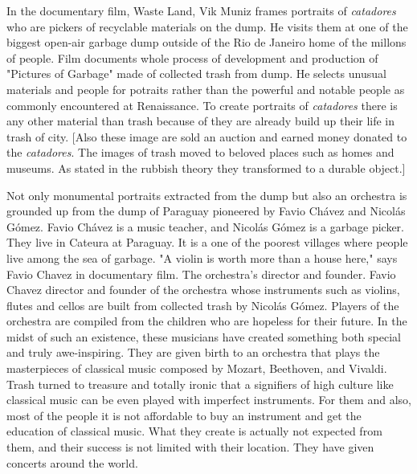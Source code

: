 In the documentary film, Waste Land, Vik Muniz frames portraits of \textit{catadores} who are pickers of recyclable materials on the dump. He visits them at one of the biggest open-air garbage dump outside of the Rio de Janeiro home of the millons of people. Film documents whole process of development and production of "Pictures of Garbage" made of collected trash from dump. He selects unusual materials and people for potraits rather than the powerful and notable people as commonly encountered at Renaissance. To create portraits of \textit{catadores} there is any other material than trash because of they are already build up their life in trash of city. [Also these image are sold an auction and earned money donated to the \textit{catadores}. The images of trash moved to beloved places such as homes and museums. As stated in the rubbish theory they transformed to a durable object.]


Not only monumental portraits extracted from the dump but also an orchestra is grounded up from the dump of Paraguay pioneered by Favio Chávez and Nicolás Gómez. Favio Chávez is a music teacher, and Nicolás Gómez is a garbage picker. They live in Cateura at Paraguay. It is a one of the poorest villages where people live among the sea of garbage. "A violin is worth more than a house here," says Favio Chavez in documentary film. The orchestra's director and founder. Favio Chavez director and founder of the orchestra whose instruments such as violins, flutes and cellos are built from collected trash by Nicolás Gómez. Players of the orchestra are compiled from the children who are hopeless for their future. In the midst of such an existence, these musicians have created something both special and truly awe-inspiring. They are given birth to an orchestra that plays the masterpieces of classical music composed by Mozart, Beethoven, and Vivaldi. Trash turned to treasure and totally ironic that a signifiers of high culture like classical music can be even played with imperfect instruments. For them and also, most of the people it is not affordable to buy an instrument and get the education of classical music. What they create is actually not expected from them, and their success is not limited with their location. They have given concerts around the world. 

